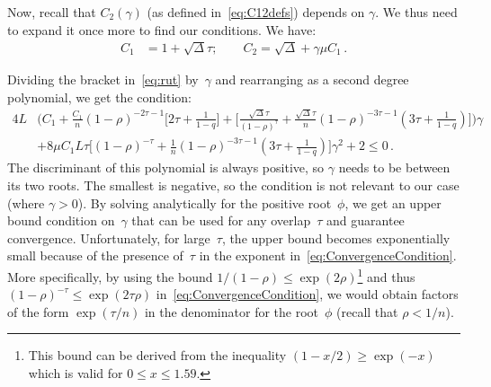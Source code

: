 \documentclass[twoside, 11pt]{article}
\newcommand{\stepsize}{\gamma}
\newcommand{\strongconvex}{\mu}
\newcommand{\overlap}{\tau}
\newcommand{\contraction}{\rho}
\newcommand{\sparsity}{\Delta}
\newcommand{\lipschitz}{L}
\begin{document}
Now, recall that $C_2(\stepsize)$ (as defined in~\eqref{eq:C12defs}) depends on $\stepsize$. We thus need to expand it once more to find our conditions.
We have:
\begin{align*}
C_1 &= 1 + \sqrt{\sparsity}\overlap ; \qquad
C_2 = \sqrt{\sparsity} + \stepsize\strongconvex C_1  \, .
\end{align*}

Dividing the bracket in~\eqref{eq:rut} by~$\stepsize$ and rearranging as a second degree polynomial, we get the condition:
\begin{align}
4\lipschitz &\Bigg(
	C_1
	+ \frac{C_1}{n}(1-\contraction)^{-2\overlap -1} \Big[2\overlap + \frac{1}{1-q}\Big]
	+ \Big[ \frac{\sqrt{\sparsity}\overlap}{(1-\contraction)^{\overlap}} + \frac{\sqrt{\sparsity}\overlap}{n}(1 -\contraction)^{-3\overlap -1}(3\overlap + \frac{1}{1 -q}) \Big]
	\Bigg) \stepsize
\nonumber \\
	&+ 8\strongconvex C_1 \lipschitz \overlap \Big[(1- \contraction)^{-\overlap} + \frac{1}{n}(1 -\contraction)^{-3\overlap -1}(3\overlap + \frac{1}{1 -q})
	\Big] \stepsize^2
	+ 2
\leq 0  \, . \label{eq:ConvergenceCondition}
\end{align}
The discriminant of this polynomial is always positive, so $\stepsize$ needs to be between its two roots.
The smallest is negative, so the condition is not relevant to our case (where $\stepsize > 0$).
By solving analytically for the positive root~$\phi$, we get an upper bound condition on~$\stepsize$ that can be used for any overlap~$\overlap$ and guarantee convergence.
Unfortunately, for large~$\overlap$, the upper bound becomes exponentially small because of the presence of~$\overlap$ in the exponent in~\eqref{eq:ConvergenceCondition}.
More specifically, by using the bound $1/(1-\contraction) \leq \exp(2\contraction)$\footnote{This bound can be derived from the inequality $(1-x/2) \geq \exp(-x)$ which is valid for $0 \leq x \leq 1.59$.} and thus $(1-\contraction)^{-\overlap} \leq \exp(2 \overlap \contraction)$ in~\eqref{eq:ConvergenceCondition}, we would obtain factors of the form $\exp(\overlap/n)$ in the denominator for the root~$\phi$ (recall that $\contraction < 1/n$).
\end{document}
